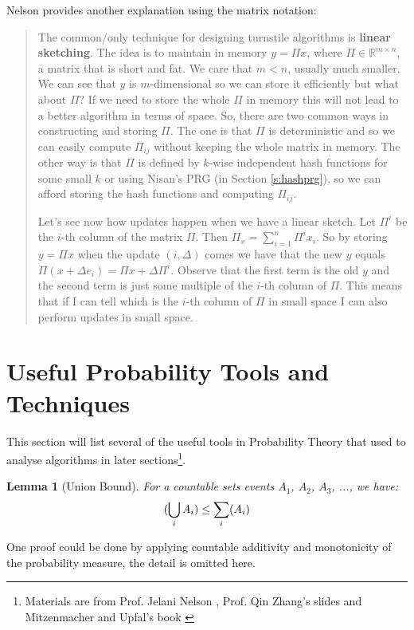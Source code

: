 \documentclass[11pt]{article}
\theoremstyle{plain}
\newtheorem{lemma}[theorem]{Lemma}
\let\Pr\relax
\DeclareMathOperator*{\Pr}{\mathbb{P}}
\begin{document}
Nelson provides another explanation using the matrix notation:
\begin{quotation}
	The common/only technique for designing turnstile algorithms is 
	\textbf{linear sketching}. The idea is to maintain in memory $y = \Pi x$, 
	where $\Pi \in \mathbb{R}^{m \times n}$, a matrix that is short and fat. We 
	care that $m<n$, usually much smaller. We can see that $y$ is 
	$m$-dimensional so we can store it efficiently but what about $\Pi$? If we 
	need to store the whole $\Pi$ in memory this will not lead to a better 
	algorithm in terms of space. So, there are two common ways in 
	constructing and storing $\Pi$. The one is that $\Pi$ is deterministic and 
	so we can easily compute $\Pi_{ij}$ without keeping the whole matrix in 
	memory. The other way is that $\Pi$ is defined by $k$-wise independent 
	hash functions for some small $k$ or using Nisan's PRG (in 
	Section  \ref{s:hashprg}), so we can afford storing the hash 
	functions and computing $\Pi_{ij}$.	
	
	Let's see now how updates happen when we have a linear sketch. Let 
	$\Pi^i$ be the $i$-th column of the matrix $\Pi$. Then $\Pi_x = \sum_{i=1}^n 
	\Pi^i x_i$. So by storing $y = \Pi x$ when the update $(i,\Delta)$ comes we 
	have that the new $y$ equals $\Pi(x+ \Delta e_i) = \Pi x + \Delta \Pi^i$. 
	Observe that the first term is the old $y$ and the second term is just some 
	multiple of the $i$-th column of $\Pi$. This means that if I can tell which is 
	the $i$-th column of $\Pi$ in small space I can also perform updates in 
	small space.
\end{quotation}

\section{Useful Probability Tools and Techniques}
This section will list several of the useful tools in Probability Theory that used 
to analyse algorithms in later sections\footnote{Materials are from Prof. 
Jelani Nelson  \cite{Nel2015-web}, Prof. Qin Zhang's 
slides  \cite{zhang2017-slides} and Mitzenmacher and 
Upfal's book  \cite{MU-probability} }.

\begin{lemma}[Union Bound]
\label{le:unionbound}
	For a countable sets events $A_1$, $A_2$, $A_3$, ..., we have:
	\[
	\Pr(\bigcup_i A_i)\leq \sum_i \Pr(A_i)
	\]
\end{lemma}
One proof could be done by applying countable additivity and monotonicity 
of the probability measure, the detail is omitted here. 
\end{document}
